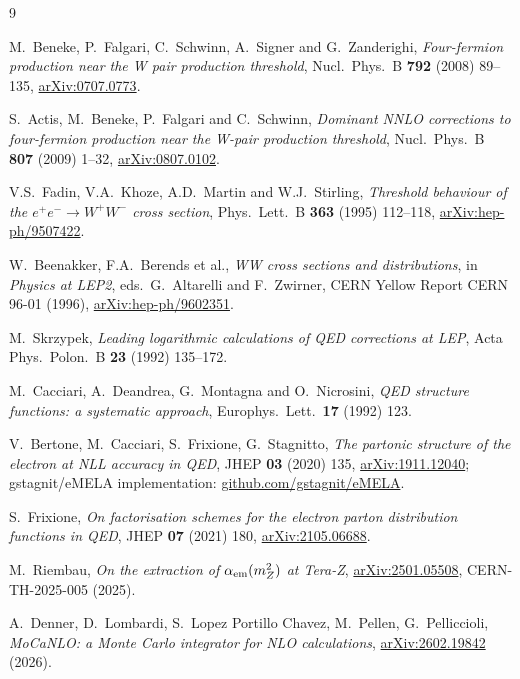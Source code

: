\documentclass[11pt,a4paper]{article}
\newcommand{\arxiv}[1]{\href{https://arxiv.org/abs/#1}{arXiv:#1}}
\begin{document}
\begin{thebibliography}{9}

M.~Beneke, P.~Falgari, C.~Schwinn, A.~Signer and G.~Zanderighi,
\emph{Four-fermion production near the W pair production threshold},
Nucl.\ Phys.\ B \textbf{792} (2008) 89--135,
\arxiv{0707.0773}.

S.~Actis, M.~Beneke, P.~Falgari and C.~Schwinn,
\emph{Dominant NNLO corrections to four-fermion production near the
W-pair production threshold},
Nucl.\ Phys.\ B \textbf{807} (2009) 1--32,
\arxiv{0807.0102}.

V.S.~Fadin, V.A.~Khoze, A.D.~Martin and W.J.~Stirling,
\emph{Threshold behaviour of the
$e^+e^-\!\to W^+W^-$ cross section},
Phys.\ Lett.\ B \textbf{363} (1995) 112--118,
\arxiv{hep-ph/9507422}.

W.~Beenakker, F.A.~Berends et al.,
\emph{WW cross sections and distributions},
in \emph{Physics at LEP2}, eds.\ G.~Altarelli and F.~Zwirner,
CERN Yellow Report CERN 96-01 (1996),
\arxiv{hep-ph/9602351}.

M.~Skrzypek,
\emph{Leading logarithmic calculations of QED corrections at LEP},
Acta Phys.\ Polon.\ B \textbf{23} (1992) 135--172.

M.~Cacciari, A.~Deandrea, G.~Montagna and O.~Nicrosini,
\emph{QED structure functions: a systematic approach},
Europhys.\ Lett.\ \textbf{17} (1992) 123.

V.~Bertone, M.~Cacciari, S.~Frixione, G.~Stagnitto,
\emph{The partonic structure of the electron at NLL accuracy in QED},
JHEP \textbf{03} (2020) 135, \arxiv{1911.12040};
gstagnit/eMELA implementation:
\href{https://github.com/gstagnit/eMELA}{github.com/gstagnit/eMELA}.

S.~Frixione,
\emph{On factorisation schemes for the electron parton distribution functions in QED},
JHEP \textbf{07} (2021) 180, \arxiv{2105.06688}.

M.~Riembau,
\emph{On the extraction of $\alpha_{\rm em}(m_Z^2)$ at Tera-Z},
\arxiv{2501.05508}, CERN-TH-2025-005 (2025).

A.~Denner, D.~Lombardi, S.~Lopez Portillo Chavez, M.~Pellen, G.~Pelliccioli,
\emph{MoCaNLO: a Monte Carlo integrator for NLO calculations},
\arxiv{2602.19842} (2026).


\end{thebibliography}
\end{document}

